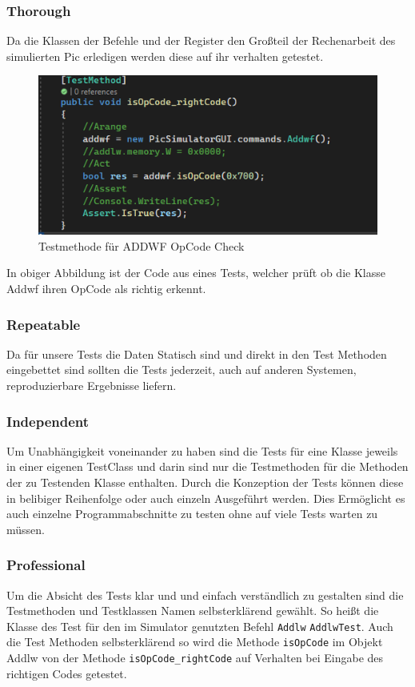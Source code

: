 \documentclass[12pt,a4paper,titlepage,ngerman,pdftex]{report}
\begin{document}
	\subsubsection{Thorough}\label{subsec:thorough}
	Da die Klassen der Befehle und der Register den Großteil der Rechenarbeit des simulierten Pic erledigen werden diese auf ihr verhalten getestet.    
	\begin{figure}
		\centering
		\includegraphics[width = \linewidth]{"images/testmethod-addwf-right.png"}
		\caption{Testmethode für ADDWF OpCode Check}
	\end{figure}
	In obiger Abbildung ist der Code aus eines Tests, welcher prüft ob die Klasse Addwf ihren OpCode als richtig erkennt.
	
	
	\subsubsection{Repeatable}
	Da für unsere Tests die Daten Statisch sind und direkt in den Test Methoden eingebettet sind sollten die Tests jederzeit,  auch auf anderen Systemen, reproduzierbare Ergebnisse liefern.
	
	\subsubsection{Independent}
	Um Unabhängigkeit voneinander zu haben sind die Tests für eine Klasse jeweils in einer eigenen TestClass und darin sind nur die Testmethoden für die Methoden der zu Testenden Klasse enthalten.
	Durch die Konzeption der Tests können diese in belibiger Reihenfolge oder auch einzeln Ausgeführt werden. 
	Dies Ermöglicht es auch einzelne Programmabschnitte zu testen ohne auf viele Tests warten zu müssen.
	\subsubsection{Professional}
	Um die Absicht des Tests klar und und einfach verständlich zu gestalten sind die Testmethoden und Testklassen Namen selbsterklärend gewählt. 
	So heißt die Klasse des Test für den im Simulator genutzten Befehl \verb|Addlw|  \verb|AddlwTest|.
	Auch die Test Methoden selbsterklärend so wird die Methode \verb|isOpCode| im Objekt Addlw von der Methode \verb|isOpCode_rightCode| auf Verhalten bei Eingabe des richtigen Codes getestet.
	
\end{document}
